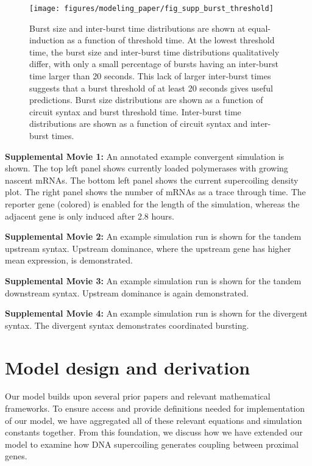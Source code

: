 \documentclass[11pt]{article}
\begin{document}
\begin{figure}[hbtp]
    \centering
    {\texttt{[image: figures/modeling\_paper/fig\_supp\_burst\_threshold]}
    \label{fig:burst_threshold_burst_size}
    \label{fig:burst_threshold_interburst_time}
    }
    \caption{Burst size and inter-burst time distributions are shown at equal-induction as a function of threshold time. At the lowest threshold time, the burst size and inter-burst time distributions qualitatively differ, with only a small percentage of bursts having an inter-burst time larger than 20 seconds. This lack of larger inter-burst times suggests that a burst threshold of at least 20 seconds gives useful predictions.
         Burst size distributions are shown as a function of circuit syntax and burst threshold time.
         Inter-burst time distributions are shown as a function of circuit syntax and inter-burst times.
    }
    \label{fig:top:burst_threshold}
\end{figure}



\FloatBarrier

{\small \noindent \textbf{Supplemental Movie 1:} An annotated example convergent simulation is shown. The top left panel shows currently loaded polymerases with growing nascent mRNAs. The bottom left panel shows the current supercoiling density plot. The right panel shows the number of mRNAs as a trace through time. The reporter gene (colored) is enabled for the length of the simulation, whereas the adjacent gene is only induced after 2.8 hours.}

{\small \noindent \textbf{Supplemental Movie 2:} An example simulation run is shown for the tandem upstream syntax. Upstream dominance, where the upstream gene has higher mean expression, is demonstrated.}

{\small \noindent \textbf{Supplemental Movie 3:} An example simulation run is shown for the tandem downstream syntax. Upstream dominance is again demonstrated.}

{\small \noindent \textbf{Supplemental Movie 4:} An example simulation run is shown for the divergent syntax. The divergent syntax demonstrates coordinated bursting.}

\FloatBarrier
\section{Model design and derivation}
\label{sec:appendix:model}
Our model builds upon several prior papers and relevant mathematical frameworks. To ensure access and provide definitions needed for implementation of our model, we have aggregated all of these relevant equations and simulation constants together. From this foundation, we discuss how we have extended our model to examine how DNA supercoiling generates coupling between proximal genes.
\end{document}
